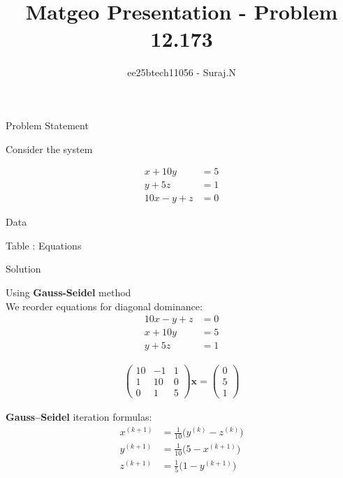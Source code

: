 \documentclass{beamer}
\title{Matgeo Presentation - Problem 12.173}
\author{ee25btech11056 - Suraj.N}
\numberwithin{equation}{section}
\theoremstyle{remark}
\newcommand{\myvec}[1]{\ensuremath{\begin{pmatrix}#1\end{pmatrix}}}
\let\vec\mathbf
\begin{document}
\begin{frame}
  \titlepage
\end{frame}

\begin{frame}{Problem Statement}

Consider the system 

\[
\begin{aligned}
x + 10y &= 5 \\
y + 5z  &= 1 \\
10x - y + z &= 0
\end{aligned}
\]

\end{frame}

\begin{frame}{Data}

\begin{table}[h!]
  \centering
  
  \caption*{Table : Equations}
  \label{12.173}
\end{table}

\end{frame}

\begin{frame}{Solution}

Using \textbf{Gauss-Seidel} method\\

We reorder equations for diagonal dominance:
\begin{align}
10x - y + z &= 0 \\
x + 10y &= 5 \\
y + 5z &= 1
\end{align}


\begin{align}
  \myvec{10 & -1 & 1\\ 1 & 10 & 0\\ 0 & 1 & 5}\vec{x}=\myvec{0\\5\\1}
\end{align}

\textbf{Gauss--Seidel} iteration formulas:
\begin{align}
x^{(k+1)} &= \tfrac{1}{10}\bigl( y^{(k)} - z^{(k)} \bigr) \\
y^{(k+1)} &= \tfrac{1}{10}\bigl( 5 - x^{(k+1)} \bigr) \\
z^{(k+1)} &= \tfrac{1}{5}\bigl( 1 - y^{(k+1)} \bigr)
\end{align}

\end{frame}
\end{document}
